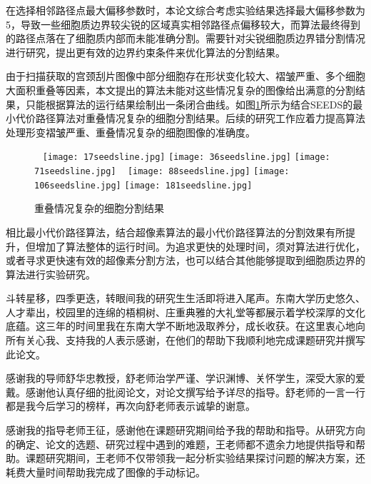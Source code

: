 \documentclass[nomlist,masters]{seuthesix}
\begin{document}
在选择相邻路径点最大偏移参数时，本论文综合考虑实验结果选择最大偏移参数为5，导致一些细胞质边界较尖锐的区域真实相邻路径点偏移较大，而算法最终得到的路径点落在了细胞质内部而未能准确分割。需要针对尖锐细胞质边界错分割情况进行研究，提出更有效的边界约束条件来优化算法的分割结果。

由于扫描获取的宫颈刮片图像中部分细胞存在形状变化较大、褶皱严重、多个细胞大面积重叠等因素，本文提出的算法未能对这些情况复杂的图像给出满意的分割结果，只能根据算法的运行结果绘制出一条闭合曲线。如图\ref{retCon}所示为结合SEEDS的最小代价路径算法对重叠情况复杂的细胞分割结果。后续的研究工作应着力提高算法处理形变褶皱严重、重叠情况复杂的细胞图像的准确度。

\begin{figure}[H]
\centering 
\texttt{[image: 17seedsline.jpg]}
\hspace{0.001\textwidth}
\texttt{[image: 36seedsline.jpg]}
\hspace{0.001\textwidth}
\texttt{[image: 71seedsline.jpg]}
\vfill
\vspace{6pt}
\centering 
\texttt{[image: 88seedsline.jpg]}
\hspace{0.001\textwidth}
\texttt{[image: 106seedsline.jpg]}
\hspace{0.001\textwidth}
\texttt{[image: 181seedsline.jpg]}
\caption{重叠情况复杂的细胞分割结果}
\label{retCon}
\end{figure}



相比最小代价路径算法，结合超像素算法的最小代价路径算法的分割效果有所提升，但增加了算法整体的运行时间。为追求更快的处理时间，须对算法进行优化，或者寻求更快速有效的超像素分割方法，也可以结合其他能够提取到细胞质边界的算法进行实验研究。

\acknowledgement
斗转星移，四季更迭，转眼间我的研究生生活即将进入尾声。东南大学历史悠久、人才辈出，校园里的连绵的梧桐树、庄重典雅的大礼堂等都展示着学校深厚的文化底蕴。这三年的时间里我在东南大学不断地汲取养分，成长收获。在这里衷心地向所有关心我、支持我的人表示感谢，在他们的帮助下我顺利地完成课题研究并撰写此论文。

感谢我的导师舒华忠教授，舒老师治学严谨、学识渊博、关怀学生，深受大家的爱戴。感谢他认真仔细的批阅论文，对论文撰写给予详尽的指导。舒老师的一言一行都是我今后学习的榜样，再次向舒老师表示诚挚的谢意。

感谢我的指导老师王征，感谢他在课题研究期间给予我的帮助和指导。从研究方向的确定、论文的选题、研究过程中遇到的难题，王老师都不遗余力地提供指导和帮助。课题研究期间，王老师不仅带领我一起分析实验结果探讨问题的解决方案，还耗费大量时间帮助我完成了图像的手动标记。
\end{document}
